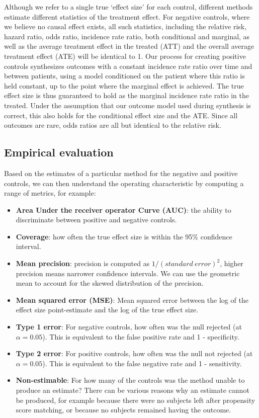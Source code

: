 \documentclass[11pt]{book}
\providecommand{\tightlist}{%
  \setlength{\itemsep}{0pt}\setlength{\parskip}{0pt}}
\begin{document}
Although we refer to a single true `effect size' for each control,
different methods estimate different statistics of the treatment effect.
For negative controls, where we believe no causal effect exists, all
such statistics, including the relative risk, hazard ratio, odds ratio,
incidence rate ratio, both conditional and marginal, as well as the
average treatment effect in the treated (ATT) and the overall average
treatment effect (ATE) will be identical to 1. Our process for creating
positive controls synthesizes outcomes with a constant incidence rate
ratio over time and between patients, using a model conditioned on the
patient where this ratio is held constant, up to the point where the
marginal effect is achieved. The true effect size is thus guaranteed to
hold as the marginal incidence rate ratio in the treated. Under the
assumption that our outcome model used during synthesis is correct, this
also holds for the conditional effect size and the ATE. Since all
outcomes are rare, odds ratios are all but identical to the relative
risk.

\subsection{Empirical evaluation}\label{empirical-evaluation}

Based on the estimates of a particular method for the negative and
positive controls, we can then understand the operating characteristic
by computing a range of metrics, for example:

\begin{itemize}
\tightlist
\item
  \textbf{Area Under the receiver operator Curve (AUC)}: the ability to
  discriminate between positive and negative controls.
\item
  \textbf{Coverage}: how often the true effect size is within the 95\%
  confidence interval.
\item
  \textbf{Mean precision}: precision is computed as
  \(1/(standard\ error)^2\), higher precision means narrower confidence
  intervals. We can use the geometric mean to account for the skewed
  distribution of the precision.
\item
  \textbf{Mean squared error (MSE)}: Mean squared error between the log
  of the effect size point-estimate and the log of the true effect size.
\item
  \textbf{Type 1 error}: For negative controls, how often was the null
  rejected (at \(\alpha = 0.05\)). This is equivalent to the false
  positive rate and 1 - specificity.
\item
  \textbf{Type 2 error}: For positive controls, how often was the null
  not rejected (at \(\alpha = 0.05\)). This is equivalent to the false
  negative rate and 1 - sensitivity.
\item
  \textbf{Non-estimable}: For how many of the controls was the method
  unable to produce an estimate? There can be various reasons why an
  estimate cannot be produced, for example because there were no
  subjects left after propensity score matching, or because no subjects
  remained having the outcome.
\end{itemize}
\end{document}
